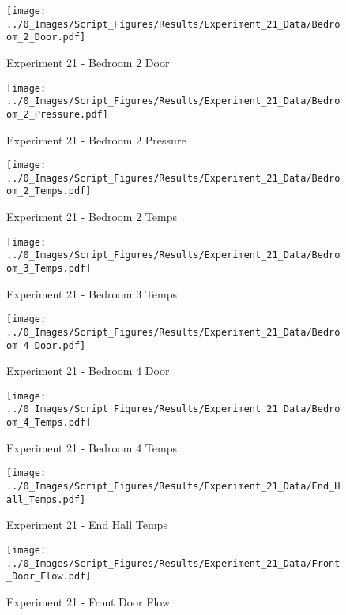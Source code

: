 	\begin{figure}[H]
		\centering
		\texttt{[image: ../0\_Images/Script\_Figures/Results/Experiment\_21\_Data/Bedroom\_2\_Door.pdf]}
		\caption[]{Experiment 21 - Bedroom 2 Door}
	\end{figure}
 
	\clearpage

	\begin{figure}[H]
		\centering
		\texttt{[image: ../0\_Images/Script\_Figures/Results/Experiment\_21\_Data/Bedroom\_2\_Pressure.pdf]}
		\caption[]{Experiment 21 - Bedroom 2 Pressure}
	\end{figure}
 

	\begin{figure}[H]
		\centering
		\texttt{[image: ../0\_Images/Script\_Figures/Results/Experiment\_21\_Data/Bedroom\_2\_Temps.pdf]}
		\caption[]{Experiment 21 - Bedroom 2 Temps}
	\end{figure}
 
	\clearpage

	\begin{figure}[H]
		\centering
		\texttt{[image: ../0\_Images/Script\_Figures/Results/Experiment\_21\_Data/Bedroom\_3\_Temps.pdf]}
		\caption[]{Experiment 21 - Bedroom 3 Temps}
	\end{figure}
 

	\begin{figure}[H]
		\centering
		\texttt{[image: ../0\_Images/Script\_Figures/Results/Experiment\_21\_Data/Bedroom\_4\_Door.pdf]}
		\caption[]{Experiment 21 - Bedroom 4 Door}
	\end{figure}
 
	\clearpage

	\begin{figure}[H]
		\centering
		\texttt{[image: ../0\_Images/Script\_Figures/Results/Experiment\_21\_Data/Bedroom\_4\_Temps.pdf]}
		\caption[]{Experiment 21 - Bedroom 4 Temps}
	\end{figure}
 

	\begin{figure}[H]
		\centering
		\texttt{[image: ../0\_Images/Script\_Figures/Results/Experiment\_21\_Data/End\_Hall\_Temps.pdf]}
		\caption[]{Experiment 21 - End Hall Temps}
	\end{figure}
 
	\clearpage

	\begin{figure}[H]
		\centering
		\texttt{[image: ../0\_Images/Script\_Figures/Results/Experiment\_21\_Data/Front\_Door\_Flow.pdf]}
		\caption[]{Experiment 21 - Front Door Flow}
	\end{figure}
 

